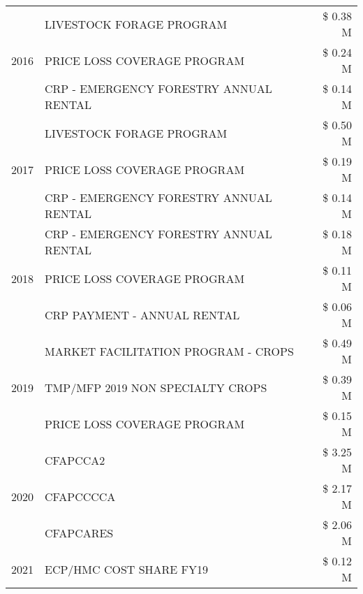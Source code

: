 \begin{tabular}{llr}
\cline{1-3}
\multirow[t]{3}{*}{2016} & LIVESTOCK FORAGE PROGRAM & \$ 0.38 M \\
 & PRICE LOSS COVERAGE PROGRAM & \$ 0.24 M \\
 & CRP - EMERGENCY FORESTRY ANNUAL RENTAL & \$ 0.14 M \\
\cline{1-3}
\multirow[t]{3}{*}{2017} & LIVESTOCK FORAGE PROGRAM & \$ 0.50 M \\
 & PRICE LOSS COVERAGE PROGRAM & \$ 0.19 M \\
 & CRP - EMERGENCY FORESTRY ANNUAL RENTAL & \$ 0.14 M \\
\cline{1-3}
\multirow[t]{3}{*}{2018} & CRP - EMERGENCY FORESTRY ANNUAL RENTAL & \$ 0.18 M \\
 & PRICE LOSS COVERAGE PROGRAM & \$ 0.11 M \\
 & CRP PAYMENT - ANNUAL RENTAL & \$ 0.06 M \\
\cline{1-3}
\multirow[t]{3}{*}{2019} & MARKET FACILITATION PROGRAM - CROPS & \$ 0.49 M \\
 & TMP/MFP 2019 NON SPECIALTY CROPS & \$ 0.39 M \\
 & PRICE LOSS COVERAGE PROGRAM & \$ 0.15 M \\
\cline{1-3}
\multirow[t]{3}{*}{2020} & CFAPCCA2 & \$ 3.25 M \\
 & CFAPCCCCA & \$ 2.17 M \\
 & CFAPCARES & \$ 2.06 M \\
\cline{1-3}
2021 & ECP/HMC COST SHARE FY19 & \$ 0.12 M \\
\cline{1-3}
\bottomrule
\end{tabular}
